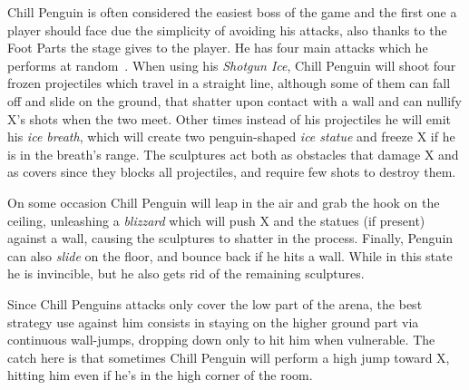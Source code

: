 Chill Penguin is often considered the easiest boss of the game and the first one a player should face due the simplicity of avoiding his attacks, also thanks to the Foot Parts the stage gives to the player. He has four main attacks which he performs at random~\cite{wiki:Chill_Penguin}. When using his \emph{Shotgun Ice}, Chill Penguin will shoot four frozen projectiles which travel in a straight line, although some of them  can fall off and slide on the ground, that shatter upon contact with a wall and can nullify X's shots when the two meet. Other times instead of his projectiles he will emit his \emph{ice breath}, which will create two penguin-shaped \emph{ice statue} and freeze X if he is in the breath's range. The sculptures act both as obstacles that damage X and as covers since they blocks all projectiles, and require few shots to destroy them. 

On some occasion Chill Penguin will leap in the air and grab the hook on the ceiling, unleashing a \emph{blizzard} which will push X and the statues (if present) against a wall, causing the sculptures to shatter in the process. Finally, Penguin can also \emph{slide} on the floor, and bounce back if he hits a wall. While in this state he is invincible, but he also gets rid of the remaining sculptures.  

Since Chill Penguins attacks only cover the low part of the arena,  the best strategy use against him consists in staying on the higher ground part via continuous wall-jumps, dropping down only to hit him when vulnerable. The catch here is that sometimes Chill Penguin will perform a high jump toward X, hitting him even if he's in the high corner of the room. 

